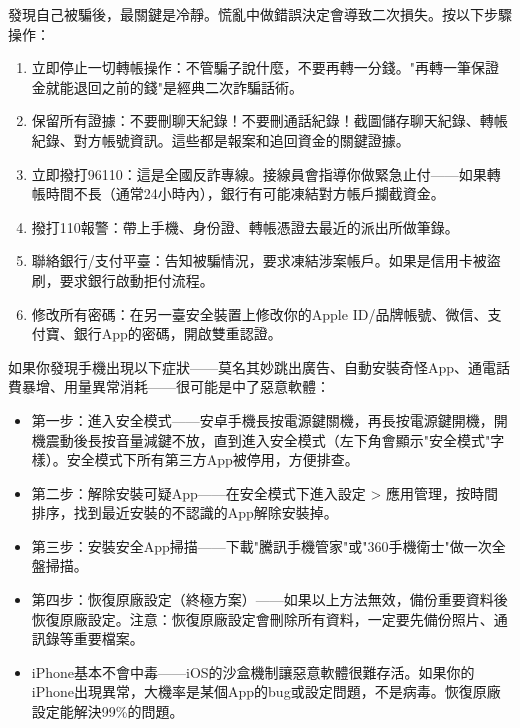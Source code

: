 發現自己被騙後，最關鍵是冷靜。慌亂中做錯誤決定會導致二次損失。按以下步驟操作：

\begin{enumerate}
  \item 立即停止一切轉帳操作：不管騙子說什麼，不要再轉一分錢。"再轉一筆保證金就能退回之前的錢"是經典二次詐騙話術。
  \item 保留所有證據：不要刪聊天紀錄！不要刪通話紀錄！截圖儲存聊天紀錄、轉帳紀錄、對方帳號資訊。這些都是報案和追回資金的關鍵證據。
  \item 立即撥打96110：這是全國反詐專線。接線員會指導你做緊急止付——如果轉帳時間不長（通常24小時內），銀行有可能凍結對方帳戶攔截資金。
  \item 撥打110報警：帶上手機、身份證、轉帳憑證去最近的派出所做筆錄。
  \item 聯絡銀行/支付平臺：告知被騙情況，要求凍結涉案帳戶。如果是信用卡被盜刷，要求銀行啟動拒付流程。
  \item 修改所有密碼：在另一臺安全裝置上修改你的Apple ID/品牌帳號、微信、支付寶、銀行App的密碼，開啟雙重認證。
\end{enumerate}


如果你發現手機出現以下症狀——莫名其妙跳出廣告、自動安裝奇怪App、通電話費暴增、用量異常消耗——很可能是中了惡意軟體：

\begin{itemize}
  \item 第一步：進入安全模式——安卓手機長按電源鍵關機，再長按電源鍵開機，開機震動後長按音量減鍵不放，直到進入安全模式（左下角會顯示"安全模式"字樣）。安全模式下所有第三方App被停用，方便排查。
  \item 第二步：解除安裝可疑App——在安全模式下進入設定 > 應用管理，按時間排序，找到最近安裝的不認識的App解除安裝掉。
  \item 第三步：安裝安全App掃描——下載"騰訊手機管家"或"360手機衛士"做一次全盤掃描。
  \item 第四步：恢復原廠設定（終極方案）——如果以上方法無效，備份重要資料後恢復原廠設定。注意：恢復原廠設定會刪除所有資料，一定要先備份照片、通訊錄等重要檔案。
  \item iPhone基本不會中毒——iOS的沙盒機制讓惡意軟體很難存活。如果你的iPhone出現異常，大機率是某個App的bug或設定問題，不是病毒。恢復原廠設定能解決99\%的問題。
\end{itemize}



